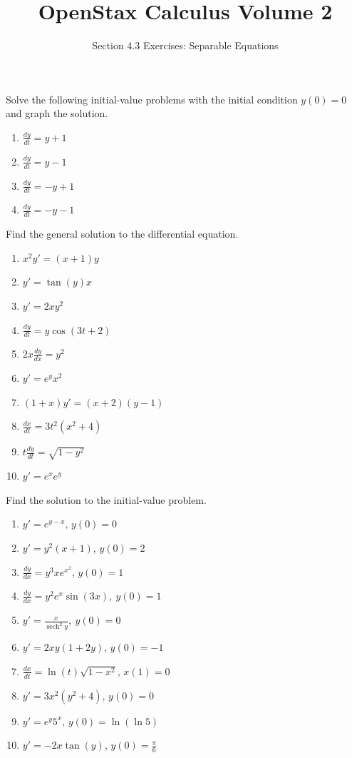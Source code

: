 \documentclass{exercises}
\title{OpenStax Calculus Volume 2}
\subtitle{Section 4.3 Exercises: Separable Equations}
\author{}
\date{}
\begin{document}
\maketitle


Solve the following initial-value problems with the initial condition $y(0)=0$ and graph the solution.

\begin{enumerate}[start=1]
\item $\frac{dy}{dt}=y+1$
\item $\frac{dy}{dt}=y-1$
\item $\frac{dy}{dt}=-y+1$
\item $\frac{dy}{dt}=-y-1$
\end{enumerate}

Find the general solution to the differential equation.

\begin{enumerate}[resume]
\item $x^{2}y'=(x+1)y$
\item $y'=\tan(y)x$
\item $y'=2xy^{2}$
\item $\frac{dy}{dt}=y\cos(3t+2)$
\item $2x\frac{dy}{dx}=y^{2}$
\item $y'=e^{y}x^{2}$
\item $(1+x)y'=(x+2)(y-1)$
\item $\frac{dx}{dt}=3t^{2}(x^{2}+4)$
\item $t\frac{dy}{dt}=\sqrt{1-y^{2}}$
\item $y'=e^{x}e^{y}$
\end{enumerate}

Find the solution to the initial-value problem.

\begin{enumerate}[resume]
\item $y'=e^{y-x}$, $y(0)=0$
\item $y'=y^{2}(x+1)$, $y(0)=2$
\item $\frac{dy}{dx}=y^{3}xe^{x^{2}}$, $y(0)=1$
\item $\frac{dy}{dx}=y^{2}e^{x}\sin(3x),\ y(0)=1$
\item $y'=\frac{x}{\operatorname{sech}^{2}y},\ y(0)=0$
\item $y'=2xy(1+2y)$, $y(0)=-1$
\item $\frac{dx}{dt}=\ln(t)\sqrt{1-x^{2}}$, $x(1)=0$
\item $y'=3x^{2}(y^{2}+4)$, $y(0)=0$
\item $y'=e^{y}5^{x}$, $y(0)=\ln(\ln 5)$
\item $y'=-2x\tan(y)$, $y(0)=\frac{\pi}{6}$
\end{enumerate}
\end{document}
